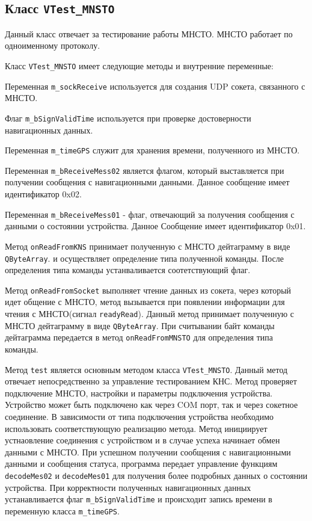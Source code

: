 \subsection{Класс \texttt{VTest\_MNSTO}}
Данный класс отвечает за тестирование работы МНСТО. МНСТО работает по одноименному протоколу.

Класс \texttt{VTest\_MNSTO} имеет следующие методы и внутренние переменные:
\begin{enum}
	\item Переменная \texttt{m\_sockReceive} используется для создания UDP сокета, связанного с МНСТО.

	\item Флаг \texttt{m\_bSignValidTime} используется при проверке достоверности навигационных данных.

	\item Переменная \texttt{m\_timeGPS} служит для хранения времени, полученного из МНСТО.

	\item Переменная \texttt{m\_bReceiveMess02} является флагом, который выставляется при получении сообщения с
		навигационными данными. Данное сообщение имеет идентификатор 0x02.

	\item Переменная \texttt{m\_bReceiveMess01} - флаг, отвечающий за получения сообщения с данными о состоянии
		устройства.
		Данное Сообщение имеет идентификатор 0x01.

	\item Метод \texttt{onReadFromKNS} принимает полученную с МНСТО дейтаграмму в виде \texttt{QByteArray}.
		и осуществляет определение типа полученной команды. После определения типа команды устанваливается
		соотетствующий флаг.

	\item Метод \texttt{onReadFromSocket} выполняет чтение данных из сокета, через который идет общение с МНСТО,
		метод вызывается при появлении информации для чтения с МНСТО(сигнал \texttt{readyRead}).
		Данный метод принимает полученную с МНСТО дейтаграмму в виде \texttt{QByteArray}.
		При считывании байт команды дейтаграмма передается в метод \texttt{onReadFromMNSTO} для определения типа
		команды.

	\item Метод \texttt{test} является основным методом класса \texttt{VTest\_MNSTO}. Данный метод отвечает
		непосредственно за управление тестированием КНС. Метод проверяет подключение МНСТО, настройки и
		параметры подключения устройства. Устройство может быть подключено как через COM порт, так и через
		сокетное соединение. В зависимости от типа подключения устройства необходимо использовать
		соответствующую реализацию метода. Метод инициирует устнаовление соединения с устройством и в случае
		успеха начинает обмен данными с МНСТО. При успешном получении сообщения с навигационными данными и сообщения
		статуса, программа передает управление функциям \texttt{decodeMes02} и \texttt{decodeMes01} для
		получения более подробных данных о состоянии устройства. При корректности полученных навигационных
		данных устанавливается флаг \texttt{m\_bSignValidTime} и происходит запись времени в переменную класса
		\texttt{m\_timeGPS}.


\end{enum}
